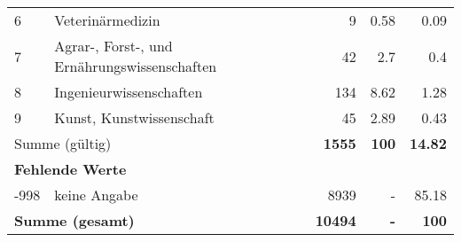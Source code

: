 \begin{longtable}{lXrrr}
     6 &
     \multicolumn{1}{X}{ Veterinärmedizin   } &


       \num{9} &
       \num[round-mode=places,round-precision=2]{0.58} &
         \num[round-mode=places,round-precision=2]{0.09} \\

     7 &
     \multicolumn{1}{X}{ Agrar-, Forst-, und Ernährungswissenschaften   } &


       \num{42} &
       \num[round-mode=places,round-precision=2]{2.7} &
         \num[round-mode=places,round-precision=2]{0.4} \\

     8 &
     \multicolumn{1}{X}{ Ingenieurwissenschaften   } &


       \num{134} &
       \num[round-mode=places,round-precision=2]{8.62} &
         \num[round-mode=places,round-precision=2]{1.28} \\

     9 &
     \multicolumn{1}{X}{ Kunst, Kunstwissenschaft   } &


       \num{45} &
       \num[round-mode=places,round-precision=2]{2.89} &
         \num[round-mode=places,round-precision=2]{0.43} \\
     \midrule
     \multicolumn{2}{l}{Summe (gültig)} &
       \textbf{\num{1555}} &
     \textbf{\num{100}} &
       \textbf{\num[round-mode=places,round-precision=2]{14.82}} \\
     \multicolumn{5}{l}{\textbf{Fehlende Werte}}\\
       -998 &
       keine Angabe &
         \num{8939} &
        - &
         \num[round-mode=places,round-precision=2]{85.18} \\
     \midrule
     \multicolumn{2}{l}{\textbf{Summe (gesamt)}} &
          \textbf{\num{10494}} &
        \textbf{-} &
        \textbf{\num{100}} \\
     \bottomrule
     \end{longtable}
     
